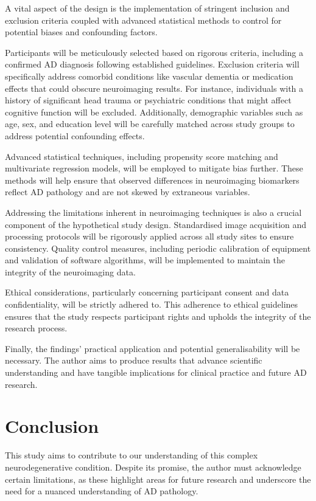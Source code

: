 \documentclass[10pt]{article}
\begin{document}
\begin{sloppypar}
  A vital aspect of the design is the implementation of stringent inclusion and exclusion criteria coupled with advanced statistical methods to control for potential biases and confounding factors.

  Participants will be meticulously selected based on rigorous criteria, including a confirmed AD diagnosis following established guidelines. Exclusion criteria will specifically address comorbid conditions like vascular dementia or medication effects that could obscure neuroimaging results. For instance, individuals with a history of significant head trauma or psychiatric conditions that might affect cognitive function will be excluded. Additionally, demographic variables such as age, sex, and education level will be carefully matched across study groups to address potential confounding effects.

  Advanced statistical techniques, including propensity score matching and multivariate regression models, will be employed to mitigate bias further. These methods will help ensure that observed differences in neuroimaging biomarkers reflect AD pathology and are not skewed by extraneous variables.

  Addressing the limitations inherent in neuroimaging techniques is also a crucial component of the hypothetical study design. Standardised image acquisition and processing protocols will be rigorously applied across all study sites to ensure consistency. Quality control measures, including periodic calibration of equipment and validation of software algorithms, will be implemented to maintain the integrity of the neuroimaging data.

  Ethical considerations, particularly concerning participant consent and data confidentiality, will be strictly adhered to. This adherence to ethical guidelines ensures that the study respects participant rights and upholds the integrity of the research process.

  Finally, the findings’ practical application and potential generalisability will be necessary. The author aims to produce results that advance scientific understanding and have tangible implications for clinical practice and future AD research.

  \section{Conclusion}
  \label{sec:conclusion}

  This study aims to contribute to our understanding of this complex neurodegenerative condition. Despite its promise, the author must acknowledge certain limitations, as these highlight areas for future research and underscore the need for a nuanced understanding of AD pathology.


\end{sloppypar}
\end{document}
